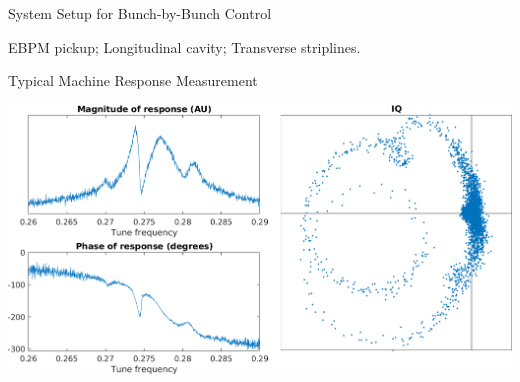 \documentclass[aspectratio=169, xcolor=table]{beamer}
\begin{document}
%
\begin{frame}{System Setup for Bunch-by-Bunch Control}


\begin{centering}

\end{centering}

\bigskip
{} EBPM pickup;
 Longitudinal cavity;
 Transverse striplines.

\end{frame}


%
\begin{frame}{Typical Machine Response Measurement}

\includegraphics[width=0.95\linewidth]{typical-sweep.png}


\end{frame}
\end{document}
